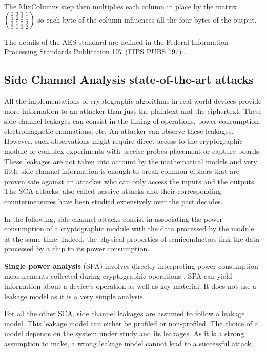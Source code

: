 \documentclass[11pt]{sdm}
\begin{document}
The MixColumns step then multiplies each column in place by the matrix 
$\begin{psmallmatrix}
    2 & 3 & 1 & 1 \\
    1 & 2 & 3 & 1 \\
    1 & 1 & 2 & 3 \\
    3 & 1 & 1 & 2
\end{psmallmatrix}$ so each byte of the column influences all the four bytes of the output.

The details of the AES standard are defined in the Federal Information Processing Standards Publication 197 (FIPS PUBS 197) \parencite{Standards2001}.

\subsection{Side Channel Analysis state-of-the-art attacks}

All the implementations of cryptographic algorithms in real world devices provide more information to an attacker than just the plaintext and the ciphertext.
These side-channel leakages can consist in the timing of operations, power consumption, electromagnetic emanations, etc.
An attacker can observe these leakages.
However, such observations might require direct access to the cryptographic module or complex experiments with precise probes placement or capture boards.
These leakages are not taken into account by the mathematical models and very little side-channel information is enough to break common ciphers that are proven safe against an attacker who can only access the inputs and the outputs.
The SCA attacks, also called passive attacks and their corresponding countermeasures have been studied extensively over the past decades.

In the following, side channel attacks consist in associating the power consumption of a cryptographic module with the data processed by the module at the same time.
Indeed, the physical properties of semiconductors link the data processed by a chip to its power consumption.

\textbf{Single power analysis} (SPA) involves directly interpreting power consumption measurements collected during cryptographic operations \parencite{Kocher_Jaffe_Jun_1999}.
SPA can yield information about a device's operation as well as key material.
It does not use a leakage model as it is a very simple analysis.

For all the other SCA, side channel leakages are assumed to follow a leakage model.
This leakage model can either be profiled or non-profiled.
The choice of a model depends on the system under study and its leakages.
As it is a strong assumption to make, a wrong leakage model cannot lead to a successful attack.
\end{document}
